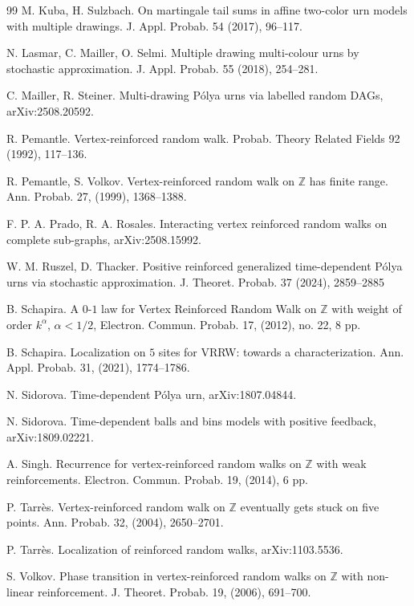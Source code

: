 \documentclass[11pt]{article}
\newcommand{\1}{{\text{\Large $\mathfrak 1$}}}
\begin{document}
\begin{thebibliography}{99}
 M. Kuba, H. Sulzbach. On martingale tail sums in affine two-color urn models with multiple drawings. 
J. Appl. Probab. 54 (2017), 96--117.

 N. Lasmar, C. Mailler, O. Selmi. Multiple drawing multi-colour urns by stochastic approximation. 
J. Appl. Probab. 55 (2018), 254--281.

 C. Mailler, R. Steiner. Multi-drawing P\'olya urns via labelled random DAGs, arXiv:2508.20592.  

 R. Pemantle. Vertex-reinforced random walk. Probab. Theory Related Fields 92 (1992), 117--136.

 R. Pemantle, S. Volkov. Vertex-reinforced random walk on $\mathbb Z$ has finite range. Ann. Probab. 27, (1999), 1368--1388.

 F. P. A. Prado, R. A. Rosales. Interacting vertex reinforced random walks on complete sub-graphs,  arXiv:2508.15992. 

 W. M. Ruszel, D. Thacker. Positive reinforced generalized time-dependent P\'olya urns via stochastic approximation. J. Theoret. Probab. 37 (2024), 2859--2885

 B. Schapira. A $0$-$1$ law for Vertex Reinforced Random Walk on $\mathbb Z$ with weight of order $k^\alpha$, $\alpha<1/2$,  
Electron. Commun. Probab. 17, (2012), no. 22, 8 pp.

 B. Schapira. Localization on $5$ sites for VRRW: towards a characterization. Ann. Appl. Probab. 31, (2021), 1774--1786. 

 N. Sidorova.  Time-dependent P\'olya urn, arXiv:1807.04844.

 N. Sidorova. Time-dependent balls and bins models with positive feedback, arXiv:1809.02221. 

 A. Singh. Recurrence for vertex-reinforced random walks on $\mathbb Z$ with weak reinforcements. Electron. Commun. Probab. 19,  (2014), 6 pp.

 P. Tarr\`es. Vertex-reinforced random walk on $\mathbb Z$ eventually gets stuck on five points. Ann. Probab. 32, (2004), 2650--2701. 

 P. Tarr\`es. Localization of reinforced random walks, arXiv:1103.5536.

 S. Volkov. Phase transition in vertex-reinforced random walks on $\mathbb Z$ with non-linear reinforcement. J. Theoret. Probab. 19, (2006), 691--700.

\end{thebibliography}
\end{document}

